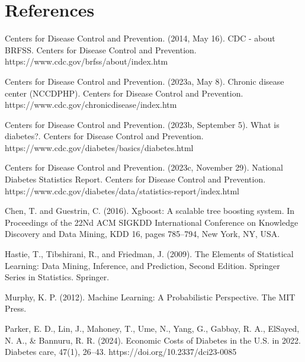 \documentclass[12pt]{article}
\begin{document}
\section{References}
\begin{hangparas}{.25in}{1}
Centers for Disease Control and Prevention. (2014, May 16). CDC - about BRFSS. Centers for Disease Control and Prevention. https://www.cdc.gov/brfss/about/index.htm 

Centers for Disease Control and Prevention. (2023a, May 8). Chronic disease center (NCCDPHP). Centers for Disease Control and Prevention. https://www.cdc.gov/chronicdisease/index.htm 

Centers for Disease Control and Prevention. (2023b, September 5). What is diabetes?. Centers for Disease Control and Prevention. https://www.cdc.gov/diabetes/basics/diabetes.html 

Centers for Disease Control and Prevention. (2023c, November 29). National Diabetes Statistics Report. Centers for Disease Control and Prevention. https://www.cdc.gov/diabetes/data/statistics-report/index.html

Chen, T. and Guestrin, C. (2016). Xgboost: A scalable tree boosting system. In Proceedings of the 22Nd ACM SIGKDD International Conference on Knowledge Discovery and Data Mining, KDD 16, pages 785–794, New York, NY, USA.

Hastie, T., Tibshirani, R., and Friedman, J. (2009). The Elements of Statistical Learning: Data Mining, Inference, and Prediction, Second Edition. Springer Series in Statistics. Springer.

Murphy, K. P. (2012). Machine Learning: A Probabilistic Perspective. The MIT Press.

Parker, E. D., Lin, J., Mahoney, T., Ume, N., Yang, G., Gabbay, R. A., ElSayed, N. A., \& Bannuru, R. R. (2024). Economic Costs of Diabetes in the U.S. in 2022. Diabetes care, 47(1), 26–43. https://doi.org/10.2337/dci23-0085
\end{hangparas}
\end{document}
